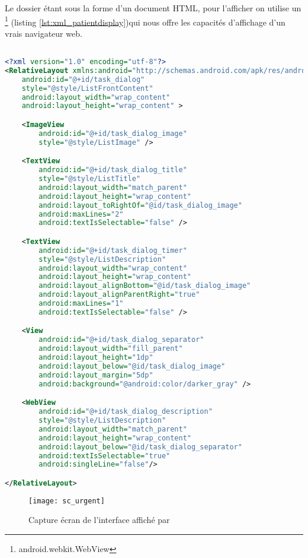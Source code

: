 Le dossier étant sous la forme d'un document HTML, pour l'afficher on utilise un \footnote{android.webkit.WebView} (listing \ref{lst:xml_patientdisplay})qui nous offre les capacités d'affichage d'un vrais navigateur web.


\begin{lstlisting}[language=xml, label=lst:xml_patientdisplay, caption=Déclaration XML du \gls{ui} utilisé par PatientDisplay]

<?xml version="1.0" encoding="utf-8"?>
<RelativeLayout xmlns:android="http://schemas.android.com/apk/res/android"
    android:id="@+id/task_dialog"
    style="@style/ListFrontContent"
    android:layout_width="wrap_content"
    android:layout_height="wrap_content" >

    <ImageView
        android:id="@+id/task_dialog_image"
        style="@style/ListImage" />

    <TextView
        android:id="@+id/task_dialog_title"
        style="@style/ListTitle"
        android:layout_width="match_parent"
        android:layout_height="wrap_content"
        android:layout_toRightOf="@id/task_dialog_image"
        android:maxLines="2"
        android:textIsSelectable="false" />

    <TextView
        android:id="@+id/task_dialog_timer"
        style="@style/ListDescription"
        android:layout_width="wrap_content"
        android:layout_height="wrap_content"
        android:layout_alignBottom="@id/task_dialog_image"
        android:layout_alignParentRight="true"
        android:maxLines="1"
        android:textIsSelectable="false" />

    <View
        android:id="@+id/task_dialog_separator"
        android:layout_width="fill_parent"
        android:layout_height="1dp"
        android:layout_below="@id/task_dialog_image"
        android:layout_margin="5dp"
        android:background="@android:color/darker_gray" />

    <WebView
        android:id="@+id/task_dialog_description"
        style="@style/ListDescription"
        android:layout_width="match_parent"
        android:layout_height="wrap_content"
        android:layout_below="@id/task_dialog_separator"
        android:textIsSelectable="true" 
        android:singleLine="false"/>

</RelativeLayout>

\end{lstlisting}

\begin{figure}
\center
\texttt{[image: sc\_urgent]}
\caption{Capture écran de l'interface affiché par }
\label{fig:sc_urgent}
\end{figure}

